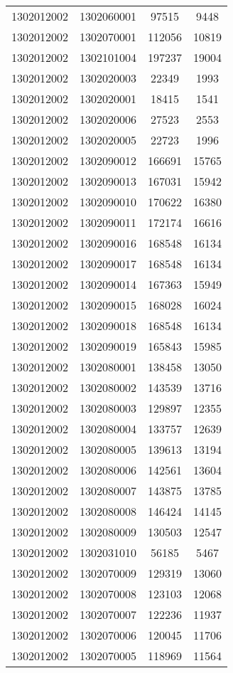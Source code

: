 \begin{longtable}{llcc}
1302012002 & 1302060001 & 97515 & 9448\\
1302012002 & 1302070001 & 112056 & 10819\\
1302012002 & 1302101004 & 197237 & 19004\\
1302012002 & 1302020003 & 22349 & 1993\\
1302012002 & 1302020001 & 18415 & 1541\\
1302012002 & 1302020006 & 27523 & 2553\\
1302012002 & 1302020005 & 22723 & 1996\\
1302012002 & 1302090012 & 166691 & 15765\\
1302012002 & 1302090013 & 167031 & 15942\\
1302012002 & 1302090010 & 170622 & 16380\\
1302012002 & 1302090011 & 172174 & 16616\\
1302012002 & 1302090016 & 168548 & 16134\\
1302012002 & 1302090017 & 168548 & 16134\\
1302012002 & 1302090014 & 167363 & 15949\\
1302012002 & 1302090015 & 168028 & 16024\\
1302012002 & 1302090018 & 168548 & 16134\\
1302012002 & 1302090019 & 165843 & 15985\\
1302012002 & 1302080001 & 138458 & 13050\\
1302012002 & 1302080002 & 143539 & 13716\\
1302012002 & 1302080003 & 129897 & 12355\\
1302012002 & 1302080004 & 133757 & 12639\\
1302012002 & 1302080005 & 139613 & 13194\\
1302012002 & 1302080006 & 142561 & 13604\\
1302012002 & 1302080007 & 143875 & 13785\\
1302012002 & 1302080008 & 146424 & 14145\\
1302012002 & 1302080009 & 130503 & 12547\\
1302012002 & 1302031010 & 56185 & 5467\\
1302012002 & 1302070009 & 129319 & 13060\\
1302012002 & 1302070008 & 123103 & 12068\\
1302012002 & 1302070007 & 122236 & 11937\\
1302012002 & 1302070006 & 120045 & 11706\\
1302012002 & 1302070005 & 118969 & 11564\\

\end{longtable}
